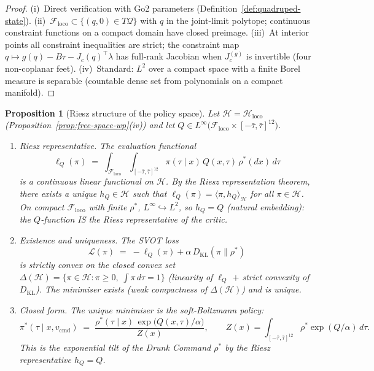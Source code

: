 \documentclass[11pt,a4paper]{article}
\newtheorem{proposition}[theorem]{Proposition}
\newcommand{\cL}{\mathcal{L}}
\newcommand{\cF}{\mathcal{F}}
\newcommand{\cH}{\mathcal{H}}
\newcommand{\DKL}{D_{\mathrm{KL}}}
\begin{document}
\begin{proof}
(i)~Direct verification with Go2 parameters
(Definition~\ref{def:quadruped-state}).
(ii)~$\cF_{\mathrm{loco}} \subset
  \{(q,0) \in T\mathcal{Q}\}$
  with $q$ in the joint-limit polytope;
  continuous constraint functions
  on a compact domain have closed preimage.
(iii)~At interior points all constraint inequalities
  are strict;
  the constraint map
  $q \mapsto g(q) - B\tau - J_c(q)^\top\lambda$
  has full-rank Jacobian
  when $J_c^{(g)}$ is invertible
  (four non-coplanar feet).
(iv)~Standard: $L^2$ over a compact space
  with a finite Borel measure is separable
  (countable dense set from polynomials
  on a compact manifold).
\end{proof}

\begin{proposition}[Riesz structure of the policy space]
\label{prop:riesz-policy}
Let $\cH = \cH_{\mathrm{loco}}$
(Proposition~\ref{prop:free-space-wp}\textup{(iv)})
and let
$Q \in L^\infty\!\bigl(
  \cF_{\mathrm{loco}} \times
  [-\bar\tau,\bar\tau]^{12}\bigr)$.
\begin{enumerate}[label=(\roman*),nosep]
\item \emph{Riesz representative.}\;
  The evaluation functional
  \[
    \ell_Q(\pi)
    \;=\;
    \int_{\cF_{\mathrm{loco}}}
    \int_{[-\bar\tau,\bar\tau]^{12}}
    \!\!\pi(\tau \mid x)\,Q(x,\tau)\,
    \rho^*(dx)\,d\tau
  \]
  is a continuous linear functional on $\cH$.
  By the Riesz representation theorem,
  there exists a unique $h_Q \in \cH$
  such that
  $\ell_Q(\pi) = \langle \pi, h_Q \rangle_\cH$
  for all $\pi \in \cH$.
  On compact $\cF_{\mathrm{loco}}$
  with finite $\rho^*$,
  $L^\infty \hookrightarrow L^2$,
  so $h_Q = Q$ (natural embedding):
  the $Q$-function IS
  the Riesz representative of the critic.

\item \emph{Existence and uniqueness.}\;
  The SVOT loss
  \[
    \cL(\pi)
    \;=\;
    -\ell_Q(\pi)
    + \alpha\,\DKL(\pi \| \rho^*)
  \]
  is strictly convex on the closed convex set
  $\Delta(\cH)
    = \{\pi \in \cH :
    \pi \geq 0,\;
    \textstyle\int \pi\,d\tau = 1\}$
  (linearity of $\ell_Q$
  $+$ strict convexity of $\DKL$).
  The minimiser exists
  (weak compactness of $\Delta(\cH)$)
  and is unique.

\item \emph{Closed form.}\;
  The unique minimiser is the
  soft-Boltzmann policy:
  \begin{equation}\label{eq:boltzmann-optimal}
    \pi^*(\tau \mid x, v_{\mathrm{cmd}})
    \;=\;
    \frac{\rho^*(\tau \mid x)\,
      \exp\!\bigl(Q(x,\tau)/\alpha\bigr)}
         {Z(x)},
    \qquad
    Z(x)
    = \!\int_{[-\bar\tau,\bar\tau]^{12}}
      \!\!\rho^*\exp(Q/\alpha)\,d\tau.
  \end{equation}
  This is the exponential tilt of
  the Drunk Command $\rho^*$
  by the Riesz representative $h_Q = Q$.
\end{enumerate}
\end{proposition}
\end{document}
